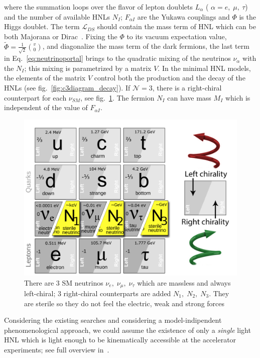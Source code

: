 where the summation loops over the flavor of lepton doublets ${L}_{\alpha}$ ( $\alpha = e,\; \mu, \: \tau$) and the number of available HNLs $N_{I}$; $F_{\alpha I} $ are the Yukawa couplings and $\Phi$ is the Higgs doublet. The term $\mathcal{L}_{DS}$ should contain the mass term of HNL which can be both Majorana or Dirac~\cite{Alekhin_2016}.
Fixing the $\Phi$ to its vacuum expectation value, $\widetilde \Phi = \frac{1}{\sqrt{2}} \binom{v}{0}$, and diagonalize the mass term of the dark fermions, the last term in Eq.~\ref{eq:neutrinoportal} brings to the quadratic mixing of the neutrinos $\nu_{\alpha}$ with the $N_{I}$; this mixing is parametrized by a matrix $V.$ In the minimal HNL models, the elements of the matrix $V$ control both the production and the decay of the HNLs (see fig.~\ref{fig:c3diagram_decay}). 
If $\mathcal{N} = 3$, there is a right-chiral counterpart for each $\nu_{SM}$, see fig.~\ref{fig:c3sm_extension}. The fermion $N_I$ can have mass $M_I$ which is independent  of the value of $F_{\alpha I}$.
\begin{figure}[t!]
  \centering
  \includegraphics[width=.60\textwidth]{Figures/c3/SM_extension}
    \caption{There are 3 SM neutrinos $\nu_{e}, \; \nu_{\mu}, \;\nu_{\tau}$ which are massless and always left-chiral; 3 right-chiral counterparts are added $N_{1}, \; N_{2}, \;N_{3}$. They are sterile so they do not feel the electric, weak and strong forces}
  \label{fig:c3sm_extension}
\end{figure}

Considering the existing searches and considering a model-indipendent phenomenological approach, we could assume the existence of only a \emph{single} light HNL which is light enough to be kinematically accessible at the accelerator experiments; see full overview in~\cite{Atre_2009}. 

